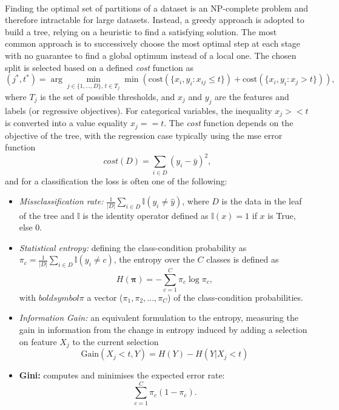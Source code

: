 \paragraph{}Finding the optimal set of partitions of a dataset is an NP-complete problem and therefore intractable for large datasets. Instead, a greedy approach is adopted to build a tree, relying on a heuristic to find a satisfying solution. The most common approach is to successively choose the most optimal step at each stage with no guarantee to find a global optimum instead of a local one. The chosen split is selected based on a defined \textit{cost} function as
\begin{equation}\label{eq:DTcost}
    (j^*, t^*) = \arg\min_{j\in \{1, ..., D\},\, t \in T_j} \min \left(\text{cost} (\{x_i, y_i : x_{ij} \leq t\}) + \text{cost}(\{x_i, y_i : x_j > t\}) \right),
\end{equation}
where $T_j$ is the set of possible thresholds, and $x_j$ and $y_j$ are the features and labels (or regressive objectives). For categorical variables, the inequality $x_j >< t$ is converted into a value equality $x_j == t$. The \textit{cost} function depends on the objective of the tree, with the regression case typically using the \gls{mse} error function \[cost(D) = \sum_{i\in D}(y_i - \bar{y})^2,\] and for a classification the loss is often one of the following:
\begin{itemize}
    \item \textit{Missclassification rate:} $\frac{1}{|D|} \sum_{i \in D} \mathbb{I}(y_i \neq \hat{y})$, where $D$ is the data in the leaf of the tree and $\mathbb{I}$ is the identity operator defined as $\mathbb{I}(x) = 1$ if $x$ is True, else $0$. 
    \item \textit{Statistical entropy:} defining the class-condition probability as $\pi_c = \frac{1}{|D|} \sum_{i \in D} \mathbb{I}(y_i \neq c)$, the entropy over the $C$ classes is defined as
    \begin{equation}\label{eq:statEntropy}
        H(\boldsymbol{\pi}) = - \sum_{c=1}^C \pi_c \log \pi_c,
    \end{equation}
    with $boldsymbol{\pi}$ a vector ($\pi_1, \pi_2, ..., \pi_C$) of the class-condition probabilities.
    \item \textit{Information Gain:} an equivalent formulation to the entropy, measuring the gain in information from the change in entropy induced by adding a selection on feature $X_j$ to the current selection 
    \[ \text{Gain}(X_j < t, Y) = H(Y) - H(Y | X_j < t) \]
    \item \textbf{Gini:} computes and minimises the expected error rate:
    \begin{equation}\label{eq:giniClass} 
        \sum_{c=1}^C \pi_c (1 - \pi_c).
    \end{equation}
\end{itemize}

